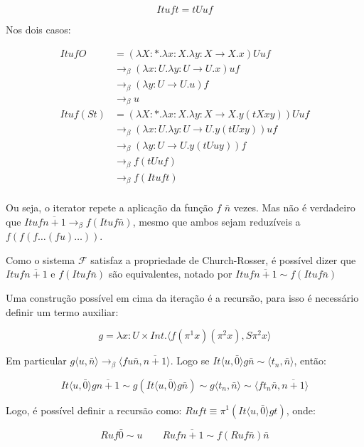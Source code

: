 \documentclass[../main.tex]{subfiles}
\begin{document}
$$It u f t = tUuf$$

Nos dois casos:

\begin{align*}
    It u f O & = (\lambda X : \ast . \lambda x : X . \lambda y : X \to X . x) U u f \\
             & \to_{\beta} (\lambda x : U . \lambda y : U \to U . x) uf \\
             & \to_{\beta} (\lambda y : U \to U . u) f \\
             & \to_{\beta} u \\
    It u f (S t) & = (\lambda X : \ast . \lambda x : X . \lambda y : X \to X . y (t X xy)) U u f \\
    & \to_{\beta} (\lambda x : U . \lambda y : U \to U . y (t U xy)) uf \\
    & \to_{\beta} (\lambda y : U \to U . y (t U uy)) f \\
    & \to_{\beta} f (t U uf) \\
    & \to_{\beta} f (It u f t) \\
\end{align*}

Ou seja, o iterator repete a aplicação da função $f$ $\bar{n}$ vezes. Mas não é verdadeiro que $It u f \overline{n + 1} \to_{\beta} f (It u f \bar{n})$, mesmo que ambos sejam reduzíveis a $f ( f ( f \dots (f u) \dots))$.

Como o sistema $\mathcal{F}$ satisfaz a propriedade de Church-Rosser, é possível dizer que $It u f \overline{n + 1}$ e $f (It u f \bar{n})$ são equivalentes, notado por $It u f \overline{n + 1} \sim f (It u f \bar{n})$

Uma construção possível em cima da iteração é a recursão, para isso é necessário definir um termo auxiliar:

$$g = \lambda x : U \times Int . \langle f (\pi^1 x)(\pi^2 x), S \pi^2 x \rangle$$

Em particular $g \langle u, \bar{n} \rangle \to_{\beta} \langle f u \bar{n}, \overline{n + 1} \rangle$. Logo se $It \langle u, \bar{0} \rangle g \bar{n} \sim \langle t_n, \bar{n} \rangle$, então:

$$It \langle u, \bar{0} \rangle g \overline{n + 1} \sim g (It \langle u, \bar{0} \rangle g \bar{n}) \sim g \langle t_n, \bar{n} \rangle \sim \langle f t_n \bar{n}, \overline{n + 1} \rangle$$

Logo, é possível definir a recursão como: $R u f t \equiv \pi^1 (It \langle u, \bar{0} \rangle gt)$, onde:

$$R u f \bar{0} \sim u \qquad R u f \overline{n + 1} \sim f (R u f \bar{n}) \bar{n}$$
\end{document}

